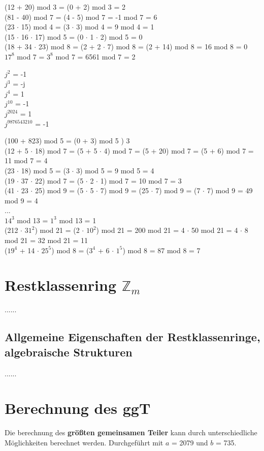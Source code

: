 	(12 + 20) mod 3 = (0 + 2) mod 3 = 2 \\
	(81 - 40) mod 7 = (4 - 5) mod 7 = -1 mod 7 = 6 \\
	(23 $\cdot$ 15) mod 4 = (3 $\cdot$ 3) mod 4 = 9 mod 4 = 1 \\
	(15 $\cdot$ 16 $\cdot$ 17) mod 5 = (0 $\cdot$ 1 $\cdot$ 2) mod 5 = 0 \\
	(18 + 34 $\cdot$ 23) mod 8 = (2 + 2 $\cdot$ 7) mod 8 = (2 + 14) mod 8 = 16 mod 8 = 0 \\
	$17^8$ mod 7 = $3^8$ mod 7 = 6561 mod 7 = 2 
	
	$j^{2}$ = -1 \\
	$j^{3}$ = -j \\
	$j^{4}$ = 1 \\
	$j^{10}$ = -1 \\
	$j^{2024}$ = 1 \\
	$j^{9876543210}$ = -1
	
	(100 + 823) mod 5 = (0 + 3) mod 5 ) 3 \\
	(12 + 5 $\cdot$ 18) mod 7 = (5 + 5 $\cdot$ 4) mod 7 = (5 + 20) mod 7 = (5 + 6) mod 7 = 11 mod 7 = 4 \\
	(23 $\cdot$ 18) mod 5 = (3 $\cdot$ 3) mod 5 = 9 mod 5 = 4 \\
	(19 $\cdot$ 37 $\cdot$ 22) mod 7 = (5 $\cdot$ 2 $\cdot$ 1) mod 7 = 10 mod 7 = 3 \\
	(41 $\cdot$ 23 $\cdot$ 25) mod 9 = (5 $\cdot$ 5 $\cdot$ 7) mod 9 = (25 $\cdot$ 7) mod 9 = (7 $\cdot$ 7) mod 9 = 49 mod 9 = 4 \\
	... \\
	$14^3$ mod 13 = $1^3$ mod 13 = 1 \\
	(212 $\cdot$ $31^2$) mod 21 = (2 $\cdot$ $10^2$) mod 21 = 200 mod 21 = 4 $\cdot$ 50 mod 21 = 4 $\cdot$ 8 mod 21 = 32 mod 21 = 11 \\
	($19^4$ + 14 $\cdot$ $25^5$) mod 8 = ($3^4$ + 6 $\cdot$ $1^5$) mod 8 = 87 mod 8 = 7
\section{Restklassenring $\mathbb{Z}_m$}
......

\subsection{Allgemeine Eigenschaften der Restklassenringe, algebraische Strukturen}
......

\section{Berechnung des ggT}
Die berechnung des \textbf{größten gemeinsamen Teiler} kann durch unterschiedliche Möglichkeiten berechnet werden. Durchgeführt mit $a$ = 2079 und $b$ = 735.

